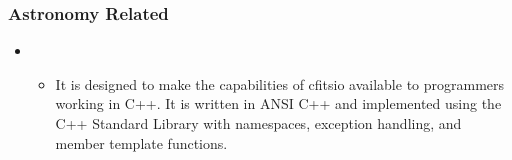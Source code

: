 \documentclass[letterpaper,10pt,english]{sphinxmanual}
\begin{document}
\subsubsection{Astronomy Related}
\label{\detokenize{resource/programing/cpp_basic:astronomy-related}}\begin{itemize}
\item {} 
\begin{itemize}
\item {} 
It is designed to make the capabilities of cfitsio available to
programmers working in C++. It is written in ANSI C++ and
implemented using the C++ Standard Library with namespaces,
exception handling, and member template functions.

\end{itemize}

\end{itemize}
\end{document}
